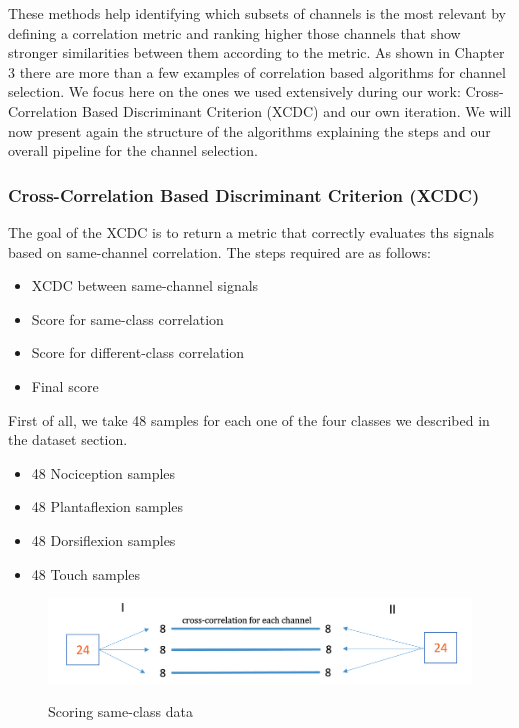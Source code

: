 \documentclass{Configuration_Files/PoliMi3i_thesis}
\begin{document}
These methods help identifying which subsets of channels is the most relevant by defining a correlation metric and ranking higher those channels that show stronger similarities between them according to the metric.
As shown in Chapter 3 there are more than a few examples of correlation based algorithms for channel selection.
We focus here on the ones we used extensively during our work: Cross-Correlation Based Discriminant Criterion (XCDC) and our own iteration.
We will now present again the structure of the algorithms explaining the steps and our overall pipeline for the channel selection.

\subsubsection{Cross-Correlation Based Discriminant
Criterion (XCDC)}

The goal of the XCDC is to return a metric that correctly evaluates ths signals based on same-channel correlation.
The steps required are as follows:
\begin{itemize}
	\item XCDC between same-channel signals
	\item Score for same-class correlation
	\item Score for different-class correlation
	\item Final score
\end{itemize}

First of all, we take 48 samples for each one of the four classes we described in the dataset section.

\begin{itemize}
	\item 48 Nociception samples
	\item 48 Plantaflexion samples
	\item 48 Dorsiflexion samples
	\item 48 Touch samples
\end{itemize}

\begin{figure}[H]
	\includegraphics[scale=0.4]{dataSplit.png}
	\centering
    \label{scoreSameClass}
    \caption{Scoring same-class data}
\end{figure}
\end{document}
